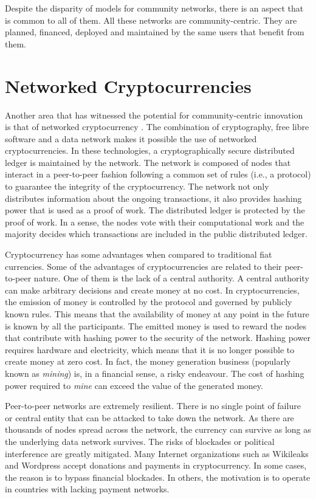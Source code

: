 \documentclass[journal]{IEEEtran}
\begin{document}
Despite the disparity of models for community networks, there is an aspect that is common to all of them.
All these networks are community-centric.
They are planned, financed, deployed and maintained by the same users that benefit from them.



\section{Networked Cryptocurrencies}
\label{sec:networked-cryptocurrencies}

Another area that has witnessed the potential for community-centric innovation is that of networked cryptocurrency \cite{nakamoto2008bpe}.
The combination of cryptography, free libre software and a data network makes it possible the use of networked cryptocurrencies.
In these technologies, a cryptographically secure distributed ledger is maintained by the network.
The network is composed of nodes that interact in a peer-to-peer fashion following a common set of rules (i.e., a protocol) to guarantee the integrity of the cryptocurrency.
The network not only distributes information about the ongoing transactions, it also provides hashing power that is used as a proof of work.
The distributed ledger is protected by the proof of work.
In a sense, the nodes vote with their computational work and the majority decides which transactions are included in the public distributed ledger.

Cryptocurrency has some advantages when compared to traditional fiat currencies.
Some of the advantages of cryptocurrencies are related to their peer-to-peer nature.
One of them is the lack of a central authority.
A central authority can make arbitrary decisions and create money at no cost.
In cryptocurrencies, the emission of money is controlled by the protocol and governed by publicly known rules.
This means that the availability of money at any point in the future is known by all the participants.
The emitted money is used to reward the nodes that contribute with hashing power to the security of the network.
Hashing power requires hardware and electricity, which means that it is no longer possible to create money at zero cost.
In fact, the money generation business (popularly known as \emph{mining}) is, in a financial sense, a risky endeavour.
The cost of hashing power required to \emph{mine} can exceed the value of the generated money.

Peer-to-peer networks are extremely resilient.
There is no single point of failure or central entity that can be attacked to take down the network.
As there are thousands of nodes spread across the network, the currency can survive as long as the underlying data network survives.
The risks of blockades or political interference are greatly mitigated.
Many Internet organizations such as Wikileaks and Wordpress accept donations and payments in cryptocurrency.
In some cases, the reason is to bypass financial blockades.
In others, the motivation is to operate in countries with lacking payment networks.
\end{document}
